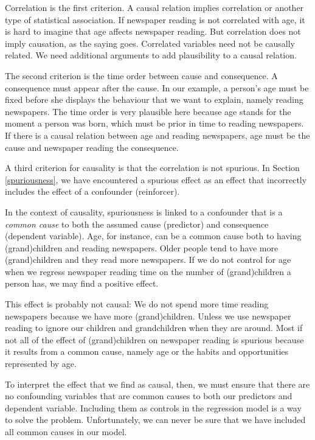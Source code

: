 \documentclass[a4paper]{book}
\theoremstyle{definition}
\theoremstyle{definition}
\theoremstyle{definition}
\theoremstyle{remark}
\begin{document}
Correlation is the first criterion. A causal relation implies
correlation or another type of statistical association. If newspaper
reading is not correlated with age, it is hard to imagine that age
affects newspaper reading. But correlation does not imply causation, as
the saying goes. Correlated variables need not be causally related. We
need additional arguments to add plausibility to a causal relation.

The second criterion is the time order between cause and consequence. A
consequence must appear after the cause. In our example, a person's age
must be fixed before she displays the behaviour that we want to explain,
namely reading newspapers. The time order is very plausible here because
age stands for the moment a person was born, which must be prior in time
to reading newspapers. If there is a causal relation between age and
reading newspapers, age must be the cause and newspaper reading the
consequence.

A third criterion for causality is that the correlation is not spurious.
In Section \ref{spuriousness}, we have encountered a spurious effect as
an effect that incorrectly includes the effect of a confounder
(reinforcer).

In the context of causality, spuriousness is linked to a confounder that
is a \emph{common cause} to both the assumed cause (predictor) and
consequence (dependent variable). Age, for instance, can be a common
cause both to having (grand)children and reading newspapers. Older
people tend to have more (grand)children and they read more newspapers.
If we do not control for age when we regress newspaper reading time on
the number of (grand)children a person has, we may find a positive
effect.

This effect is probably not causal: We do not spend more time reading
newspapers because we have more (grand)children. Unless we use newspaper
reading to ignore our children and grandchildren when they are around.
Most if not all of the effect of (grand)children on newspaper reading is
spurious because it results from a common cause, namely age or the
habits and opportunities represented by age.

To interpret the effect that we find as causal, then, we must ensure
that there are no confounding variables that are common causes to both
our predictors and dependent variable. Including them as controls in the
regression model is a way to solve the problem. Unfortunately, we can
never be sure that we have included all common causes in our model.
\end{document}
